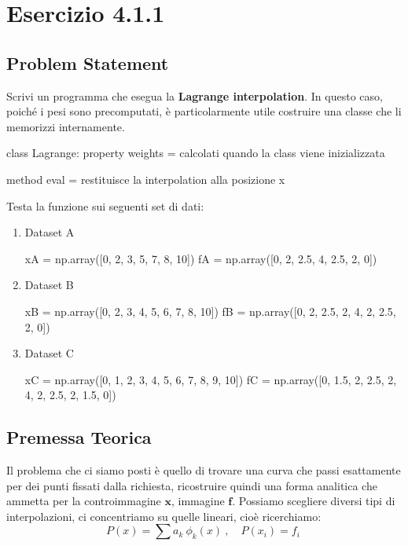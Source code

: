 \section{Esercizio 4.1.1}

\subsection{Problem Statement}
Scrivi un programma che esegua la \textbf{Lagrange interpolation}. In questo caso, poiché i pesi sono precomputati, è particolarmente utile costruire una classe che li memorizzi internamente.

\begin{elegantcode}[title=Schema della classe Lagrange]
class Lagrange:
    property weights = calcolati quando la class viene inizializzata
    
    method eval = restituisce la interpolation alla posizione x
\end{elegantcode}

Testa la funzione sui seguenti set di dati:
\begin{enumerate}
    \item Dataset A
    \begin{elegantcode}
xA = np.array([0, 2, 3, 5, 7, 8, 10])
fA = np.array([0, 2, 2.5, 4, 2.5, 2, 0])
    \end{elegantcode}
    
    \item Dataset B
    \begin{elegantcode}
xB = np.array([0, 2, 3, 4, 5, 6, 7, 8, 10])
fB = np.array([0, 2, 2.5, 2, 4, 2, 2.5, 2, 0])
    \end{elegantcode}
    
    \item Dataset C
    \begin{elegantcode}
xC = np.array([0, 1, 2, 3, 4, 5, 6, 7, 8, 9, 10])
fC = np.array([0, 1.5, 2, 2.5, 2, 4, 2, 2.5, 2, 1.5, 0])
    \end{elegantcode}
\end{enumerate}

\subsection{Premessa Teorica}
Il problema che ci siamo posti è quello di trovare una curva che passi esattamente per dei punti fissati dalla richiesta, ricostruire quindi una forma analitica che ammetta per la controimmagine $\boldsymbol{x}$, immagine $\boldsymbol f$. Possiamo scegliere diversi tipi di interpolazioni, ci concentriamo su quelle lineari, cioè ricerchiamo:
\[
P(x) = \sum a_k\ \phi_k(x)\ , \quad P(x_i) = f_i\
\]

